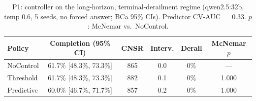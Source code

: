 \begin{table}[t]
\centering
\caption{P1: controller on the long-horizon, terminal-derailment regime (qwen2.5:32b, temp 0.6, 5 seeds, no forced answer; BCa 95\% CIs). Predictor CV-AUC $=0.33$. $p$: McNemar vs.\ NoControl.}
\label{tab:p1_longhorizon}
\begin{tabular}{lccccc}
\toprule
Policy & Completion (95\% CI) & CNSR & Interv. & Derail & McNemar $p$ \\
\midrule
NoControl & 61.7\% [48.3\%, 73.3\%] & 865 & 0.0 & 0\% & --- \\
Threshold & 61.7\% [48.3\%, 73.3\%] & 882 & 0.1 & 0\% & 1.000 \\
Predictive & 60.0\% [46.7\%, 71.7\%] & 857 & 0.2 & 0\% & 1.000 \\
\bottomrule
\end{tabular}
\end{table}
